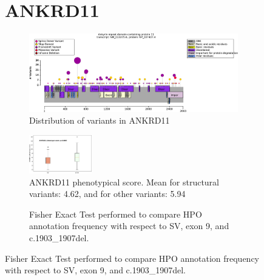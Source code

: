 \begin{figure}[htbp]
\section*{ANKRD11}
\centering
\begin{subfigure}[b]{0.95\textwidth}
\centering
\includegraphics[width=\textwidth]{ img/ANKRD11_protein_diagram.pdf} 
\captionsetup{justification=raggedright,singlelinecheck=false}
\caption{Distribution of variants in ANKRD11}
\end{subfigure}

\vspace{2em}

\begin{subfigure}[b]{0.95\textwidth}
\centering
\includegraphics[width=0.3\textwidth]{ img/ANKRD11_phenoscore.pdf} 
\captionsetup{justification=raggedright,singlelinecheck=false}
\caption{ANKRD11 phenotypical score. Mean for structural variants: 4.62, and for other variants: 5.94}
\end{subfigure}

\vspace{2em}

\begin{subfigure}[b]{0.95\textwidth}
\centering
{}
\captionsetup{justification=raggedright,singlelinecheck=false}
\caption{Fisher Exact Test performed to compare HPO annotation frequency with respect to SV, exon 9, and c.1903\_1907del.}
\end{subfigure}
\end{figure}

